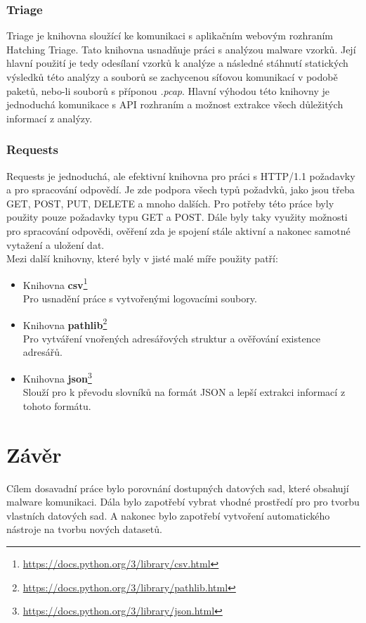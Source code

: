 \subsection*{Triage}
Triage je knihovna sloužící ke komunikaci s aplikačním webovým rozhraním Hatching Triage. Tato knihovna usnadňuje práci s analýzou malware vzorků.
Její hlavní použití je tedy odesílaní vzorků k analýze a následné stáhnutí statických výsledků této analýzy a souborů se zachycenou síťovou komunikací v 
podobě paketů, nebo-li souborů s příponou \textit{.pcap}. Hlavní výhodou této knihovny je jednoduchá komunikace s API rozhraním a možnost extrakce všech důležitých
informací z analýzy.

\subsection*{Requests}
Requests je jednoduchá, ale efektivní knihovna pro práci s HTTP/1.1 požadavky a pro spracování odpovědí. Je zde podpora všech typů požadvků, jako jsou
třeba GET, POST, PUT, DELETE a mnoho dalších. Pro potřeby této práce byly použity pouze požadavky typu GET a POST. Dále byly taky využity možnosti
pro spracování odpovědi, ověření zda je spojení stále aktivní a nakonec samotné vytažení a uložení dat.\\ 

Mezi další knihovny, které byly v jisté malé míře použity patří:
\begin{itemize}
    \item Knihovna \textbf{csv}\footnote{\href{https://docs.python.org/3/library/csv.html}{https://docs.python.org/3/library/csv.html}}\\Pro usnadění práce s vytvořenými logovacími soubory.
    \item Knihovna \textbf{pathlib}\footnote{\href{https://docs.python.org/3/library/pathlib.html}{https://docs.python.org/3/library/pathlib.html}}\\Pro vytváření vnořených adresářových struktur a ověřování existence adresářů.
    \item Knihovna \textbf{json}\footnote{\href{https://docs.python.org/3/library/json.html}{https://docs.python.org/3/library/json.html}}\\Slouží pro k převodu slovníků na formát JSON a lepší extrakci informací z tohoto formátu.
\end{itemize}



    
\chapter{Závěr}
Cílem dosavadní práce bylo porovnání dostupných datových sad, které obsahují malware komunikaci. Dála bylo zapotřebí vybrat vhodné prostředí pro 
pro tvorbu vlastních datových sad. A nakonec bylo zapotřebí vytvoření automatického nástroje na tvorbu nových datasetů.

